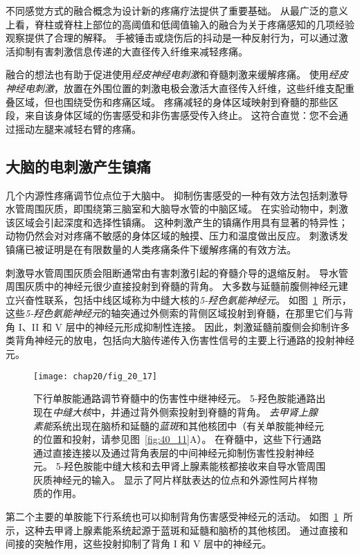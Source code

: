 不同感觉方式的融合概念为设计新的疼痛疗法提供了重要基础。
从最广泛的意义上看，脊柱或脊柱上部位的高阈值和低阈值输入的融合为关于疼痛感知的几项经验观察提供了合理的解释。
手被锤击或烧伤后的抖动是一种反射行为，可以通过激活抑制有害刺激信息传递的大直径传入纤维来减轻疼痛。


融合的想法也有助于促进使用\textit{经皮神经电刺激}和脊髓刺激来缓解疼痛。
使用\textit{经皮神经电刺激}，放置在外围位置的刺激电极会激活大直径传入纤维，这些纤维支配重叠区域，但也围绕受伤和疼痛区域。
疼痛减轻的身体区域映射到脊髓的那些区段，来自该身体区域的伤害感受和非伤害感受传入终止。
这符合直觉：您不会通过摇动左腿来减轻右臂的疼痛。



\subsection{大脑的电刺激产生镇痛}

几个内源性疼痛调节位点位于大脑中。
抑制伤害感受的一种有效方法包括刺激导水管周围灰质，即围绕第三脑室和大脑导水管的中脑区域。
在实验动物中，刺激该区域会引起深度和选择性镇痛。
这种刺激产生的镇痛作用具有显著的特异性；
动物仍然会对对疼痛不敏感的身体区域的触摸、压力和温度做出反应。
刺激诱发镇痛已被证明是在有限数量的人类疼痛条件下缓解疼痛的有效方法。


刺激导水管周围灰质会阻断通常由有害刺激引起的脊髓介导的退缩反射。
导水管周围灰质中的神经元很少直接投射到脊髓的背角。 
大多数与延髓前腹侧神经元建立兴奋性联系，包括中线区域称为中缝大核的\textit{5-羟色氨能神经元}。
如图~\ref{fig:20_17}~所示，这些\textit{5-羟色氨能神经元}的轴突通过外侧索的背侧区域投射到脊髓，在那里它们与背角 I、II 和 V 层中的神经元形成抑制性连接。
因此，刺激延髓前腹侧会抑制许多类背角神经元的放电，包括向大脑传递传入伤害性信号的主要上行通路的投射神经元。


\begin{figure}[htbp]
	\centering
	\texttt{[image: chap20/fig\_20\_17]}
	\caption{下行单胺能通路调节脊髓中的伤害性中继神经元。
		5-羟色胺能通路出现在\textit{中缝大核}中，并通过背外侧索投射到脊髓的背角。
		\textit{去甲肾上腺素能}系统出现在脑桥和延髓的\textit{蓝斑}和其他核团中（有关单胺能神经元的位置和投射，请参见图~\ref{fig:40_11}A）。
		在脊髓中，这些下行通路通过直接连接以及通过背角表层的中间神经元抑制伤害性投射神经元。
		5-羟色胺能中缝大核和去甲肾上腺素能核都接收来自导水管周围灰质神经元的输入。
		显示了阿片样肽表达的位点和外源性阿片样物质的作用。}
	\label{fig:20_17}
\end{figure}


第二个主要的单胺能下行系统也可以抑制背角伤害感受神经元的活动。
如图~\ref{fig:20_17}~所示，这种去甲肾上腺素能系统起源于蓝斑和延髓和脑桥的其他核团。
通过直接和间接的突触作用，这些投射抑制了背角 I 和 V 层中的神经元。




